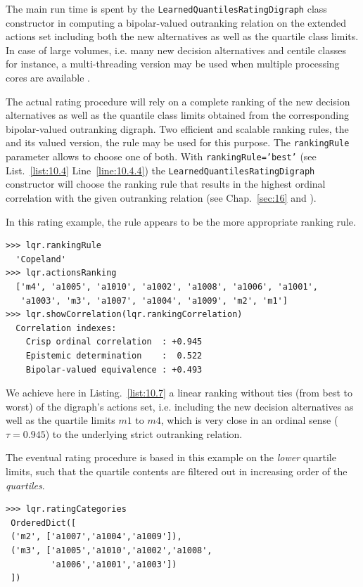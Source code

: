 The main run time is spent by the \texttt{LearnedQuantilesRatingDigraph} class constructor in computing a bipolar-valued outranking relation on the extended actions set including both the new alternatives as well as the quartile class limits. In case of large volumes, i.e. many new decision alternatives and centile classes for instance, a multi-threading version may be used when multiple processing cores are available \citep{BIS-2021b}.

The actual rating procedure will rely on a complete ranking of the new decision alternatives as well as the quantile class limits obtained from the corresponding bipolar-valued outranking digraph. Two efficient and scalable ranking rules, the \Copeland and its valued version, the \NetFlows rule may be used for this purpose. The \texttt{rankingRule} parameter allows to choose one of both. With \texttt{rankingRule='best'} (see List.~\vref{list:10.4} Line~\ref{line:10.4.4}) the \texttt{LearnedQuantiles\-RatingDigraph} constructor will choose the ranking rule that results in the highest ordinal correlation with the given outranking relation (see Chap.~\ref{sec:16} and \citep{BIS-2012a}).

In this rating example, the \Copeland rule appears to be the more appropriate ranking rule.
\begin{lstlisting}[caption={\Copeland ranking of new alternatives and historical quartile limits},label=list:10.7]
>>> lqr.rankingRule
  'Copeland'
>>> lqr.actionsRanking
  ['m4', 'a1005', 'a1010', 'a1002', 'a1008', 'a1006', 'a1001',
   'a1003', 'm3', 'a1007', 'a1004', 'a1009', 'm2', 'm1'] 
>>> lqr.showCorrelation(lqr.rankingCorrelation)
  Correlation indexes:
    Crisp ordinal correlation  : +0.945
    Epistemic determination    :  0.522
    Bipolar-valued equivalence : +0.493
\end{lstlisting}

We achieve here in Listing.~\vref{list:10.7} a linear ranking without ties (from best to worst) of the digraph's actions set, i.e. including the new decision alternatives as well as the quartile limits $m1$ to $m4$, which is very close in an ordinal sense ($\tau = 0.945$) to the underlying strict outranking relation.

The eventual rating procedure is based in this example on the \emph{lower} quartile limits, such that the quartile contents are filtered out in increasing order of the \emph{quartiles}.
\begin{lstlisting}
>>> lqr.ratingCategories
 OrderedDict([
 ('m2', ['a1007','a1004','a1009']),
 ('m3', ['a1005','a1010','a1002','a1008',
         'a1006','a1001','a1003'])
 ])
\end{lstlisting}    

